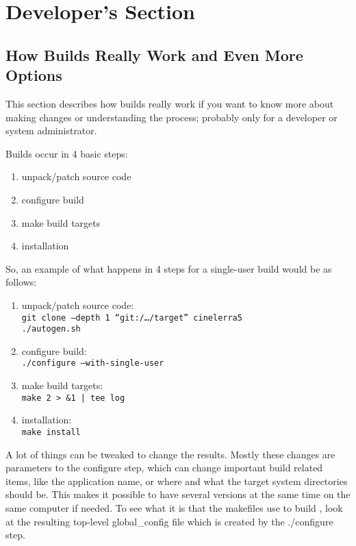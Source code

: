\chapter{Developer's Section}%
\label{cha:developer's_section}

\section{How Builds Really Work and Even More Options}
\label{sec:builds_really_work_more_options}

This section describes how builds really work if you want to know more about making changes or understanding the process; probably only for a developer or system administrator.

Builds occur in 4 basic steps:

\begin{enumerate}[nosep]
	\item unpack/patch source code
	\item configure build
	\item make build targets
	\item installation
\end{enumerate}

So, an example of what happens in 4 steps for a single-user build would be as follows:

\begin{enumerate}[nosep]
	\item unpack/patch source code: \\
	\texttt{git clone --depth 1 ``git:/{\dots}/target'' cinelerra5} \\
	\texttt{./autogen.sh}
	\item configure build:\\
	\texttt{./configure --with-single-user}
	\item make build targets:\\
	\texttt{make 2 > \&1 | tee log}
	\item installation:\\
	\texttt{make install}
\end{enumerate}

A lot of things can be tweaked to change the results. Mostly these changes are parameters to the configure step, which can change important build related items, like the application name, or where and what the target system directories should be. This makes it possible to have several versions at the same time on the same computer if needed. To see what it is that the makefiles use to build \CGG{}, look at the resulting top-level global\_config file which is created by the ./configure step.

